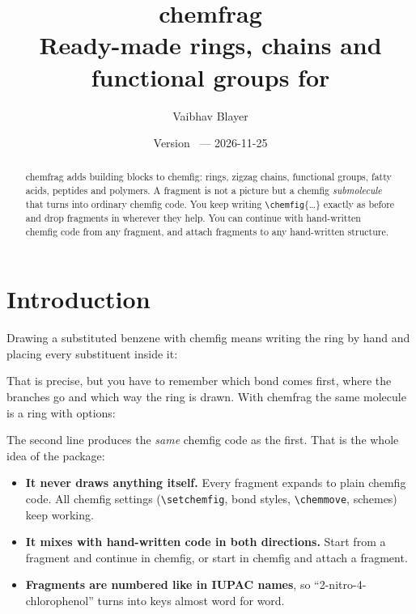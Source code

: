 \documentclass[11pt]{article}
\title{\sffamily\bfseries\color{cfaccent}chemfrag\\[0.3em]
  \large\color{black}\mdseries Ready-made rings, chains and functional groups for \pkg{chemfig}}
\author{Vaibhav Blayer}
\date{Version \chemfragversion\ --- 2026-11-25}
\newcommand\cs[1]{\texttt{\textbackslash#1}}
\newcommand\pkg[1]{\textsf{#1}}
\begin{document}
\maketitle
\thispagestyle{empty}

\begin{center}
\hfill
{}\hfill
{}\hfill
{}
\end{center}

\begin{abstract}
\pkg{chemfrag} adds building blocks to \pkg{chemfig}: rings, zigzag chains,
functional groups, fatty acids, peptides and polymers. A fragment is not a picture but a \pkg{chemfig}
\emph{submolecule} that turns into ordinary \pkg{chemfig} code. You keep
writing \cs{chemfig}\{\dots\} exactly as before and drop fragments in wherever
they help. You can continue with hand-written \pkg{chemfig} code from any
fragment, and attach fragments to any hand-written structure.
\end{abstract}

\newpage
\tableofcontents
\newpage

\section{Introduction}

Drawing a substituted benzene with \pkg{chemfig} means writing the ring by
hand and placing every substituent inside it:
\begin{example}
\end{example}
That is precise, but you have to remember which bond comes first, where the
branches go and which way the ring is drawn. With \pkg{chemfrag} the same
molecule is a ring with options:
\begin{example}
\end{example}
The second line produces the \emph{same} \pkg{chemfig} code as the first.
That is the whole idea of the package:
\begin{itemize}
  \item \textbf{It never draws anything itself.} Every fragment expands to
        plain \pkg{chemfig} code. All \pkg{chemfig} settings (\cs{setchemfig},
        bond styles, \cs{chemmove}, schemes) keep working.
  \item \textbf{It mixes with hand-written code in both directions.} Start
        from a fragment and continue in \pkg{chemfig}, or start in
        \pkg{chemfig} and attach a fragment.
  \item \textbf{Fragments are numbered like in IUPAC names}, so
        ``2-nitro-4-chlorophenol'' turns into keys almost word for word.
\end{itemize}
\end{document}
